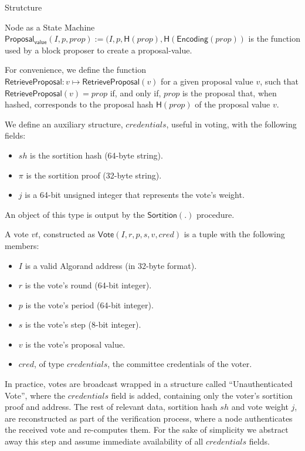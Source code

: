 \documentclass[10pt,a4paper]{article}
\begin{document}
\begin{section}{Strutcture}
\begin{subsection}{Node as a State Machine}
$\mathsf{Proposal_{value}}(I, p, prop) := (I, p, \mathsf{H}(prop), \mathsf{H}(\mathsf{Encoding}(prop))$ is the function used
by a block proposer to create a proposal-value.

For convenience, we define the function $\mathsf{RetrieveProposal}:v\mapsto{\mathsf{RetrieveProposal}}(v)$ for a given proposal value 
$v$,  such that $\mathsf{RetrieveProposal}(v) = prop$ if, and only if, $prop$ is the proposal that, when hashed, corresponds 
to the proposal hash $\mathsf{H}(prop)$ of the proposal value $v$.

We define an auxiliary structure, $credentials$, useful in voting, with the following fields:
\begin{itemize}
    \item $sh$ is the sortition hash (64-byte string).
    \item $\pi$ is the sortition proof (32-byte string).
    \item $j$ is a 64-bit unsigned integer that represents the vote's weight.
\end{itemize}
An object of this type is output by the $\mathsf{Sortition}(.)$ procedure.

A vote $vt$, constructed as $\mathsf{Vote}(I,r,p,s,v,cred)$ is a tuple with the following members:
\begin{itemize}
    \item $I$ is a valid Algorand address (in 32-byte format).
    \item $r$ is the vote's round (64-bit integer).
    \item $p$ is the vote's period (64-bit integer).
    \item $s$ is the vote's step (8-bit integer).
    \item $v$ is the vote's proposal value.
    \item $cred$, of type $credentials$, the committee credentials of the voter.
\end{itemize}

In practice, votes are broadcast wrapped in a structure called ``Unauthenticated Vote'', 
where the $credentials$ field is added, containing only the voter's sortition proof and 
address.
The rest of relevant data, sortition hash $sh$ and vote weight $j$, are reconstructed as part 
of the verification process, 
where a node authenticates the received vote and re-computes them.
For the sake of simplicity we abstract away this step and assume immediate availability of all 
$credentials$ fields.



\end{subsection}
\end{section}
\end{document}
